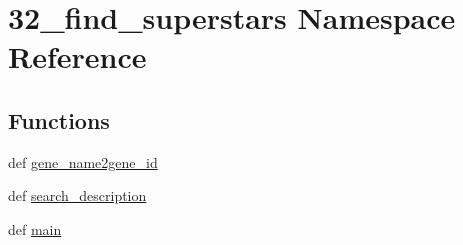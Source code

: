 \hypertarget{namespace32__find__superstars}{\section{32\-\_\-find\-\_\-superstars Namespace Reference}
\label{namespace32__find__superstars}
}
\subsection*{Functions}
\begin{DoxyCompactItemize}
\item 
def \hyperlink{namespace32__find__superstars_aee086befdef458bcf465c4006f18074f}{gene\-\_\-name2gene\-\_\-id}
\item 
def \hyperlink{namespace32__find__superstars_ad4a9e0bf9d7dd77ba50eabf856c5a2a5}{search\-\_\-description}
\item 
def \hyperlink{namespace32__find__superstars_a1ea3d8868750de382b0dcab1abe74649}{main}
\end{DoxyCompactItemize}


